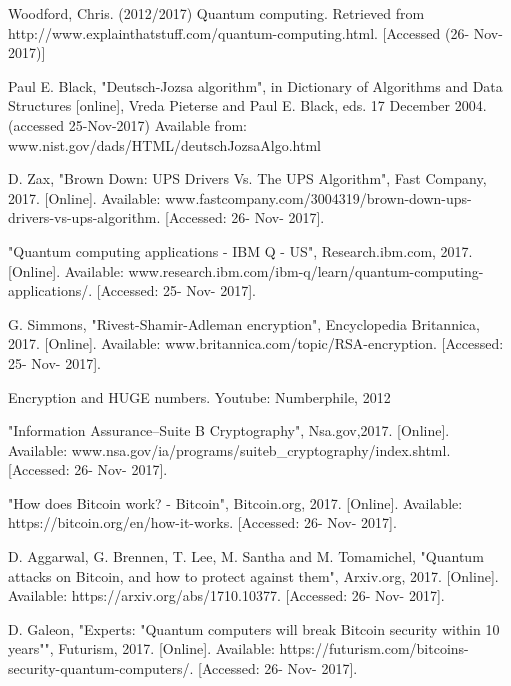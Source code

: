 \documentclass[10pt,journal,compsoc]{IEEEtran}
\begin{document}
\begin{thebibliography}{1}
	Woodford, Chris. (2012/2017) Quantum computing. Retrieved from http://www.explainthatstuff.com/quantum-computing.html. [Accessed (26- Nov- 2017)] 	
	

	Paul E. Black, "Deutsch-Jozsa algorithm", in Dictionary of Algorithms and Data Structures [online], Vreda Pieterse and Paul E. Black, eds. 17 December 2004. (accessed 25-Nov-2017) Available from: www.nist.gov/dads/HTML/deutschJozsaAlgo.html	
	
	D. Zax, "Brown Down: UPS Drivers Vs. The UPS Algorithm", Fast Company, 2017. [Online]. Available: www.fastcompany.com/3004319/brown-down-ups-drivers-vs-ups-algorithm. [Accessed: 26- Nov- 2017].
	

	"Quantum computing applications - IBM Q - US", Research.ibm.com, 2017. [Online]. Available: www.research.ibm.com/ibm-q/learn/quantum-computing-applications/. [Accessed: 25- Nov- 2017].


	
	G. Simmons, "Rivest-Shamir-Adleman encryption", Encyclopedia Britannica, 2017. [Online]. Available: www.britannica.com/topic/RSA-encryption. [Accessed: 25- Nov- 2017].

	
	Encryption and HUGE numbers. Youtube: Numberphile, 2012

	"Information Assurance--Suite B Cryptography", Nsa.gov,2017. [Online]. Available: www.nsa.gov/ia/programs/suiteb\_cryptography/index.shtml. [Accessed: 26- Nov- 2017].

	"How does Bitcoin work? - Bitcoin", Bitcoin.org, 2017. [Online]. Available: https://bitcoin.org/en/how-it-works. [Accessed: 26- Nov- 2017].
	
	D. Aggarwal, G. Brennen, T. Lee, M. Santha and M. Tomamichel, "Quantum attacks on Bitcoin, and how to protect against them", Arxiv.org, 2017. [Online]. Available: https://arxiv.org/abs/1710.10377. [Accessed: 26- Nov- 2017].
	
		
	D. Galeon, "Experts: "Quantum computers will break Bitcoin security within 10 years"", Futurism, 2017. [Online]. Available: https://futurism.com/bitcoins-security-quantum-computers/. [Accessed: 26- Nov- 2017].



	
	
	


	
	

	
	





	
		

	

\end{thebibliography}




\end{document}
